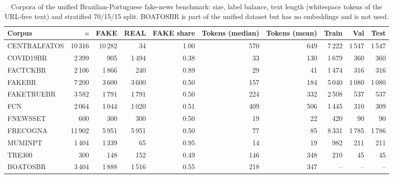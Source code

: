 \begin{table}[t]
\centering
\small
\caption{Corpora of the unified Brazilian-Portuguese fake-news benchmark: size, label balance, text length (whitespace tokens of the URL-free text) and stratified 70/15/15 split. BOATOSBR is part of the unified dataset but has no embeddings and is not used.}
\label{tab:b-corpus-statistics}
\begin{tabular}{lrrrrrrrrr}
\toprule
Corpus & $n$ & FAKE & REAL & FAKE share & Tokens (median) & Tokens (mean) & Train & Val & Test \\
\midrule
CENTRALFATOS & 10\,316 & 10\,282 & 34 & 1.00 & 570 & 649 & 7\,222 & 1\,547 & 1\,547 \\
COVID19BR & 2\,399 & 905 & 1\,494 & 0.38 & 33 & 130 & 1\,679 & 360 & 360 \\
FACTCKBR & 2\,106 & 1\,866 & 240 & 0.89 & 29 & 41 & 1\,474 & 316 & 316 \\
FAKEBR & 7\,200 & 3\,600 & 3\,600 & 0.50 & 157 & 184 & 5\,040 & 1\,080 & 1\,080 \\
FAKETRUEBR & 3\,582 & 1\,791 & 1\,791 & 0.50 & 224 & 332 & 2\,508 & 537 & 537 \\
FCN & 2\,064 & 1\,044 & 1\,020 & 0.51 & 409 & 506 & 1\,445 & 310 & 309 \\
FNEWSSET & 600 & 300 & 300 & 0.50 & 19 & 22 & 420 & 90 & 90 \\
FRECOGNA & 11\,902 & 5\,951 & 5\,951 & 0.50 & 77 & 85 & 8\,331 & 1\,785 & 1\,786 \\
MUMINPT & 1\,404 & 1\,339 & 65 & 0.95 & 14 & 19 & 982 & 211 & 211 \\
TRE300 & 300 & 148 & 152 & 0.49 & 146 & 348 & 210 & 45 & 45 \\
BOATOSBR & 3\,404 & 1\,888 & 1\,516 & 0.55 & 218 & 347 & -- & -- & -- \\
\bottomrule
\end{tabular}
\end{table}
